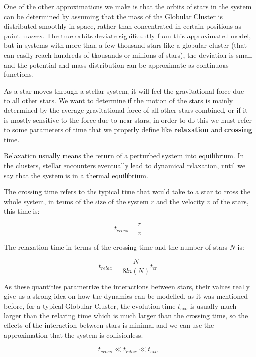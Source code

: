 One of the other approximations we make is that the orbits of stars in the system can be determined by assuming that the mass of the Globular Cluster is distributed smoothly in space, rather than concentrated in certain positions as point masses. The true orbits deviate significantly from this approximated model, but in systems with more than a few thousand stars like a globular cluster (that can easily reach hundreds of thousands or millions of stars), the deviation is small and the potential and mass distribution can be approximate as continuous functions. 

As a star moves through a stellar system, it will feel the gravitational force due to all other stars. We want to determine if the motion of the stars is mainly determined by the average gravitational force of all other stars combined, or if it is mostly sensitive to the force due to near stars, in order to do this we must refer to some parameters of time that we properly define like \textbf{relaxation} and \textbf{crossing} time. 

Relaxation usually means the return of a perturbed system into equilibrium. In the clusters, stellar encounters eventually lead to dynamical relaxation, until we say that the system is in a thermal equilibrium. 

The crossing time refers to the typical time that would take to a star to cross the whole system, in terms of the size of the system $r$ and the velocity $v$ of the stars, this time is:

\begin{equation}
t_{cross}=\frac{r}{v}
\end{equation}

The relaxation time in terms of the crossing time and the number of stars $N$ is:

\begin{equation}
t_{relax}=\frac{N}{8ln(N)}t_{cr}
\end{equation}

As these quantities parametrize the interactions between stars, their values really give us a strong idea on how the dynamics can be modelled, as it was mentioned before, for a typical Globular Cluster, the evolution time $t_{evo}$ is usually much larger than the relaxing time which is much larger than the crossing time, so the effects of the interaction between stars is minimal and we can use the approximation that the system is collisionless.

\begin{equation}
t_{cross}\ll t_{relax}\ll t_{evo}
\end{equation}

